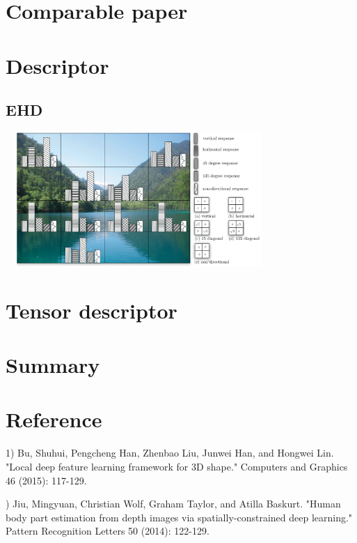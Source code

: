 \documentclass[pdftex,12pt,a4paper]{article}
\begin{document}
\section{Comparable paper}

\section{Descriptor}

\subsection{EHD}


\begin{center} %
\includegraphics[width=4.00in,height=2.00in]{let-rev2_1.png}
\end{center}




\section{Tensor descriptor}



\section{Summary}


\section{Reference}
1) Bu, Shuhui, Pengcheng Han, Zhenbao Liu, Junwei Han, and Hongwei Lin. "Local deep feature learning framework for 3D shape." Computers  and Graphics 46 (2015): 117-129.

) Jiu, Mingyuan, Christian Wolf, Graham Taylor, and Atilla Baskurt. "Human body part estimation from depth images via spatially-constrained deep learning." Pattern Recognition Letters 50 (2014): 122-129.
\end{document}
